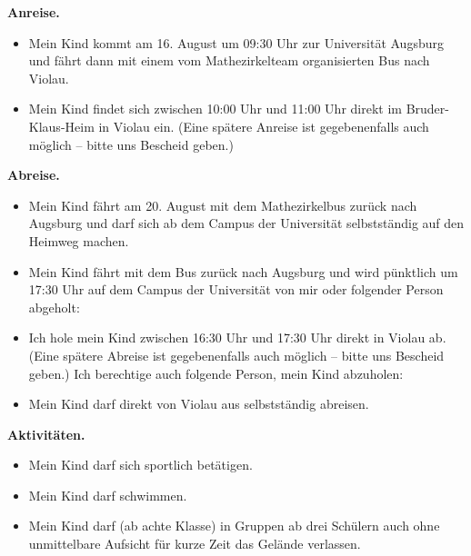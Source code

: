 \documentclass{zettel}
\begin{document}
\begin{shaded}
\textbf{Anreise.}
\begin{itemize}
\item[\checkbox] Mein Kind kommt am 16. August um 09:30 Uhr zur Universität
Augsburg und fährt dann mit einem vom Mathezirkelteam organisierten Bus nach Violau.
\item[\checkbox] Mein Kind findet sich zwischen 10:00 Uhr und 11:00
Uhr direkt im Bruder-Klaus-Heim in Violau ein. (Eine spätere Anreise ist
gegebenenfalls auch möglich -- bitte uns Bescheid geben.)
\end{itemize}
\end{shaded}

\begin{shaded}
\textbf{Abreise.}
\begin{itemize}
\item[\checkbox] Mein Kind fährt am 20. August mit dem Mathezirkelbus zurück nach Augsburg und darf sich
ab dem Campus der Universität selbstständig auf den Heimweg machen.
\item[\checkbox] Mein Kind fährt mit dem Bus zurück nach Augsburg und wird
pünktlich um 17:30 Uhr auf dem Campus der Universität von mir oder folgender
Person abgeholt:

\vspace{0.3em}
\freistLang

\item[\checkbox] Ich hole mein Kind zwischen 16:30 Uhr und 17:30
Uhr direkt in Violau ab. (Eine spätere Abreise ist gegebenenfalls auch möglich
-- bitte uns Bescheid geben.) Ich berechtige auch folgende Person, mein Kind
abzuholen:

\vspace{0.3em}
\freistLang
\item[\checkbox] Mein Kind darf direkt von Violau aus selbstständig abreisen.
\end{itemize}
\end{shaded}

\begin{shaded}
\textbf{Aktivitäten.}
\begin{itemize}
  \item[\checkbox] Mein Kind darf sich sportlich betätigen.
  \item[\checkbox] Mein Kind darf schwimmen.
  \item[\checkbox] Mein Kind darf (ab achte Klasse) in Gruppen ab drei Schülern
  auch ohne unmittelbare Aufsicht für kurze Zeit das Gelände verlassen.
\end{itemize}
\end{shaded}
\end{document}
